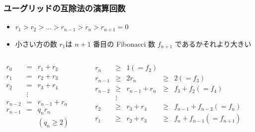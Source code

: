 \begin{frame}
\frametitle{ユーグリッドの互除法の演算回数}
  \begin{itemize}
\item \(r_1>r_2>\ldots>r_{n-1}>r_n>r_{n+1}=0\)
\item 小さい方の数 \(r_1\)は \(n+1\) 番目の Fibonacci 数 \(f_{n+1}\) であるかそれより大きい
  \end{itemize}
  \begin{columns}[t]
    \begin{column}{0.35\textwidth}
\centering
      \begin{math}
        \begin{array}{rcl}
r_0 &=& r_1 + r_2\\
r_1 &=& r_2 + r_3\\
r_2 &=& r_3 + r_4\\
&\vdots&\\
r_{n-2} &=& r_{n-1} + r_{n}\\
r_{n-1} &=& q_{n}r_{n}\\
         && (q_n\ge 2)
        \end{array}
      \end{math}
    \end{column}
    \begin{column}{0.65\textwidth}
\centering
      \begin{math}
        \begin{array}{rclcl}
r_n     &\ge& 1(=f_2)\\
r_{n-1} &\ge&2r_n&\ge& 2(=f_3)\\
r_{n-2} &\ge&r_{n-1}+r_{n}&\ge& f_3+f_2(=f_4)\\
 &\vdots& \\
r_{2} &\ge&r_{3}+r_{4}&\ge& f_{n-1}+f_{n-2}(=f_n)\\
r_{1} &\ge&r_{2}+r_{3}&\ge& f_n+f_{n-1}(=f_{n+1})\\
        \end{array}
      \end{math}
    \end{column}
  \end{columns}
\end{frame}
